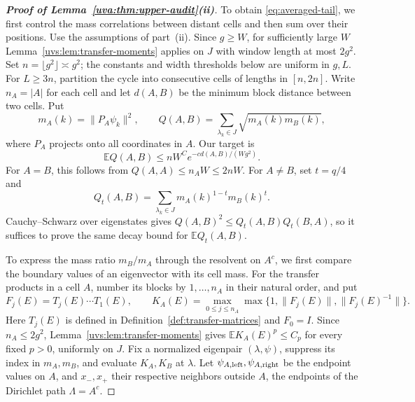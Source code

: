 \documentclass[11pt]{article}
\numberwithin{equation}{section}
\theoremstyle{remark}
\newcommand{\E}{\mathbb E}
\begin{document}
\begin{proof}[\textbf{Proof of Lemma~\ref{uva:thm:upper-audit}\textup{(ii)}}]
To obtain \eqref{eq:averaged-tail}, we first control the mass correlations
between distant cells and then sum over their positions.
Use the assumptions of part~\textup{(ii)}. Since $g\ge W$, for
sufficiently large $W$ Lemma~\ref{uvs:lem:transfer-moments} applies
on $J$ with window length at most $2g^2$.
Set $n=\lfloor g^2\rfloor\asymp g^2$;
the constants and width thresholds below are uniform in $g,L$.
For $L\ge3n$, partition the cycle into consecutive
cells of lengths in $[n,2n]$. Write $n_A=|A|$ for each cell and let $d(A,B)$ be
the minimum block distance between two cells. Put
\[
 m_A(k)=\|P_A\psi_k\|^2,\qquad
 Q(A,B)=\sum_{\lambda_k\in J}\sqrt{m_A(k)m_B(k)},
\]
where $P_A$ projects onto all coordinates in $A$. Our target is
\begin{equation}\label{uva:eq:cell-correlator}
 \E Q(A,B)\le nW^C e^{-cd(A,B)/(Wg^2)}.
\end{equation}
For $A=B$, this follows from $Q(A,A)\le n_AW\le2nW$.
For $A\ne B$, set $t=q/4$ and
\[
 Q_t(A,B)=\sum_{\lambda_k\in J}m_A(k)^{1-t}m_B(k)^t.
\]
Cauchy--Schwarz over eigenstates gives
$Q(A,B)^2\le Q_t(A,B)Q_t(B,A)$, so it suffices to prove the same
decay bound for $\E Q_t(A,B)$.

To express the mass ratio $m_B/m_A$ through the resolvent on $A^c$,
we first compare the boundary values of an eigenvector with its cell mass.
For the transfer products in a cell $A$, number its blocks by
$1,\ldots,n_A$ in their natural order, and put
\[
 F_j(E)=T_j(E)\cdots T_1(E),\qquad
 K_A(E)=\max_{0\le j\le n_A}
             \max\{1,\|F_j(E)\|,\|F_j(E)^{-1}\|\}.
\]
Here $T_j(E)$ is defined in Definition~\ref{def:transfer-matrices}
and $F_0=I$. Since $n_A\le2g^2$,
Lemma~\ref{uvs:lem:transfer-moments} gives $\E K_A(E)^p\le C_p$
for every fixed $p>0$, uniformly on $J$.
Fix a normalized eigenpair $(\lambda,\psi)$, suppress its index in
$m_A,m_B$, and evaluate $K_A,K_B$ at $\lambda$.
Let $\psi_{A,\rm left},\psi_{A,\rm right}$ be the endpoint values on $A$,
and $x_-,x_+$ their respective neighbors outside $A$, the endpoints
of the Dirichlet path $\Lambda=A^c$.


\end{proof}
\end{document}
